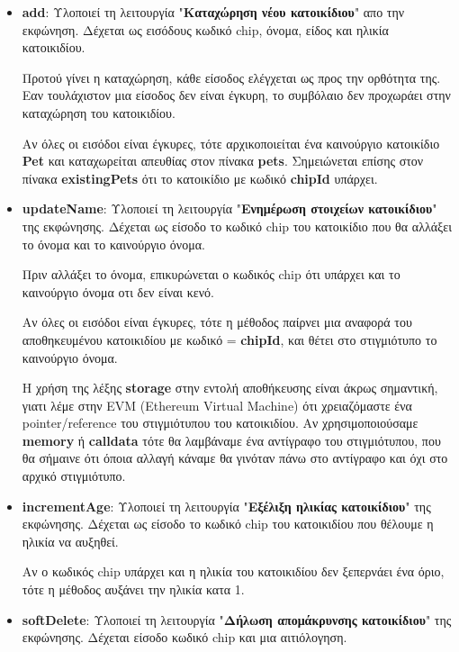 \documentclass[12pt,a4paper]{article}
\begin{document}
\begin{itemize}
    \item \textbf{add}: Υλοποιεί τη λειτουργία "\textbf{Καταχώρηση νέου κατοικίδιου}" απο την εκφώνηση. Δέχεται ως εισόδους κωδικό chip, όνομα, είδος και ηλικία κατοικιδίου.
    
    Προτού γίνει η καταχώρηση, κάθε είσοδος ελέγχεται ως προς την ορθότητα της. Εαν τουλάχιστον μια είσοδος δεν είναι έγκυρη, το συμβόλαιο δεν προχωράει στην καταχώρηση του κατοικιδίου.

    Αν όλες οι εισόδοι είναι έγκυρες, τότε αρχικοποιείται ένα καινούργιο κατοικίδιο \textbf{Pet} και καταχωρείται απευθίας στον πίνακα \textbf{pets}. Σημειώνεται επίσης στον πίνακα \textbf{existingPets} ότι το κατοικίδιο με κωδικό \textbf{chipId} υπάρχει.

    \item \textbf{updateName}: Υλοποιεί τη λειτουργία "\textbf{Ενημέρωση στοιχείων κατοικίδιου}" της εκφώνησης. Δέχεται ως είσοδο το κωδικό chip του κατοικίδιο που θα αλλάξει το όνομα και το καινούργιο όνομα.
    
    Πριν αλλάξει το όνομα, επικυρώνεται ο κωδικός chip ότι υπάρχει και το καινούργιο όνομα οτι δεν είναι κενό.

    Αν όλες οι εισόδοι είναι έγκυρες, τότε η μέθοδος παίρνει μια αναφορά του αποθηκευμένου κατοικιδίου με κωδικό = \textbf{chipId}, και θέτει στο στιγμιότυπο το καινούργιο όνομα. 
    
    Η χρήση της λέξης \textbf{storage} στην εντολή αποθήκευσης είναι άκρως σημαντική, γιατι λέμε στην EVM (Ethereum Virtual Machine) ότι χρειαζόμαστε ένα pointer/reference του στιγμιότυπου του κατοικιδίου. Αν χρησιμοποιούσαμε \textbf{memory} ή \textbf{calldata} τότε θα λαμβάναμε ένα αντίγραφο του στιγμιότυπου, που θα σήμαινε ότι όποια αλλαγή κάναμε θα γινόταν πάνω στο αντίγραφο και όχι στο αρχικό στιγμιότυπο. 

    \item \textbf{incrementAge}: Υλοποιεί τη λειτουργία "\textbf{Εξέλιξη ηλικίας κατοικίδιου}" της εκφώνησης. Δέχεται ως είσοδο το κωδικό chip του κατοικιδίου που θέλουμε η ηλικία να αυξηθεί.
    
    Αν ο κωδικός chip υπάρχει και η ηλικία του κατοικιδίου δεν ξεπερνάει ένα όριο, τότε η μέθοδος αυξάνει την ηλικία κατα 1.

    \item \textbf{softDelete}: Υλοποιεί τη λειτουργία "\textbf{Δήλωση απομάκρυνσης κατοικίδιου}" της εκφώνησης. Δέχεται είσοδο κωδικό chip και μια αιτιόλογηση.
    

\end{itemize}
\end{document}
